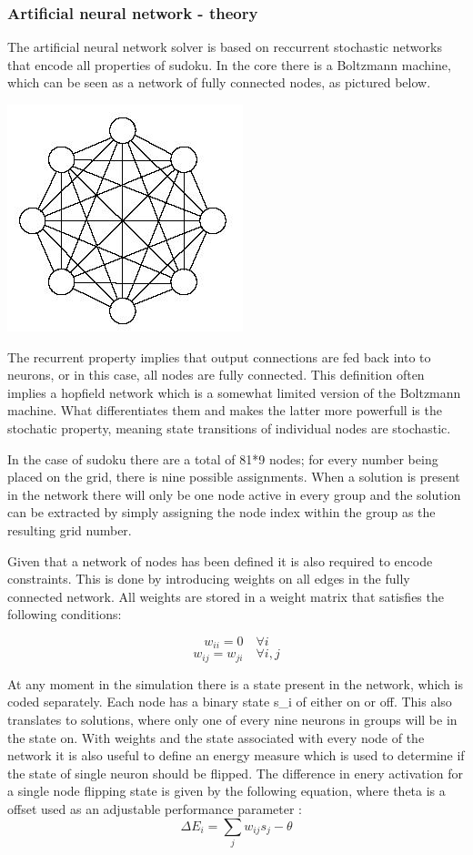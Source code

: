 \documentclass[a4paper,11pt]{kth-mag}
\begin{document}
\subsubsection{Artificial neural network - theory}
The artificial neural network solver is based on reccurrent stochastic networks that encode all properties of sudoku. In the core there is a Boltzmann machine, which can be seen as a network of fully connected nodes, as pictured below.

\includegraphics{images/neural1.png}

The recurrent property implies that output connections are fed back into to neurons, or in this case, all nodes are fully connected.
This definition often implies a hopfield network which is a somewhat limited version of the Boltzmann machine.
What differentiates them and makes the latter more powerfull is the stochatic property, meaning state transitions of individual nodes are stochastic.

In the case of sudoku there are a total of 81*9 nodes; for every number being placed on the grid, there is nine possible assignments.
When a solution is present in the network there will only be one node active in every group and the solution can be extracted by simply assigning the node index within the group as the resulting grid number.

Given that a network of nodes has been defined it is also required to encode constraints.
This is done by introducing weights on all edges in the fully connected network.
All weights are stored in a weight matrix that satisfies the following conditions:

\[
w_{ii} = 0 \quad \forall i
\]
\[
w_{ij} = w_{ji} \quad \forall i,j
\]

At any moment in the simulation there is a state present in the network, which is coded separately.
Each node has a binary state s\_i of either on or off.
This also translates to solutions, where only one of every nine neurons in groups will be in the state on.
With weights and the state associated with every node of the network it is also useful to define an energy measure which is used to determine if the state of single neuron should be flipped.
The difference in enery activation for a single node flipping state is given by the following equation, where theta is a offset used as an adjustable performance parameter \cite{boltzmann2}:
\[
\Delta E_{i} = \sum_{j} w_{ij} s_{j} - \theta
\]
\end{document}
